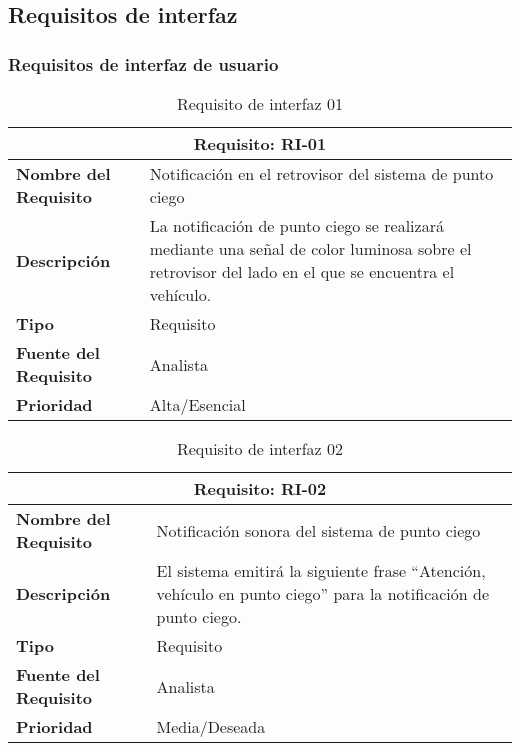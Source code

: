 

\subsection{Requisitos de interfaz}
\subsubsection{Requisitos de interfaz de usuario}

\begin{table}[H]
\begin{center}
\begin{tabular}{p{} p{7cm}}
\multicolumn{2}{c}{\textbf{Requisito: RI-01} } \\
\hline \hline
\textbf{Nombre del Requisito} & Notificación en el retrovisor del sistema de punto ciego \\
\hline
\textbf{Descripción} & La notificación de punto ciego se realizará mediante una señal de color luminosa sobre el retrovisor del lado en el que se encuentra el vehículo. \\
\hline
\textbf{Tipo} & Requisito  \\
\hline
\textbf{Fuente del Requisito} & Analista \\
\hline
\textbf{Prioridad} & Alta/Esencial  \\ \hline
\end{tabular}
\caption{Requisito de interfaz 01}
\label{tab:RI-01}
\end{center}
\end{table}

\begin{table}[H]
\begin{center}
\begin{tabular}{p{} p{7cm}}
\multicolumn{2}{c}{\textbf{Requisito: RI-02} } \\
\hline \hline
\textbf{Nombre del Requisito} & Notificación sonora del sistema de punto ciego\\
\hline
\textbf{Descripción} & El sistema emitirá la siguiente frase ``Atención, vehículo en punto ciego'' para la notificación de punto ciego. \\
\hline
\textbf{Tipo} & Requisito  \\
\hline
\textbf{Fuente del Requisito} & Analista \\
\hline
\textbf{Prioridad} & Media/Deseada  \\ \hline
\end{tabular}
\caption{Requisito de interfaz 02}
\label{tab:RI-02}
\end{center}
\end{table}

